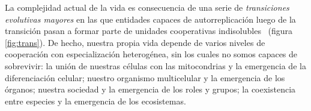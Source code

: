 \documentclass[a4paper,11pt]{book}
\theoremstyle{definition}
\begin{document}
La complejidad actual de la vida es consecuencia de una serie de \emph{transiciones evolutivas mayores} en las que entidades capaces de autorreplicaci\'on luego de la transici\'on pasan a formar parte de unidades cooperativas indisolubles~\cite{maynardSmith1995-majorTransitions, szathmary1995-evolutionaryTransitions, szathmary2015-evolutionaryTransitions} (figura \ref{fig:trans}).
%
De hecho, nuestra propia vida depende de varios niveles de cooperaci\'on con especializaci\'on heterog\'enea, sin los cuales no somos capaces de sobrevivir: la uni\'on de nuestras c\'elulas con las mitocondrias y la emergencia de la diferenciaci\'on celular; nuestro organismo multicelular y la emergencia de los \'organos; nuestra sociedad y la emergencia de los roles y grupos; la coexistencia entre especies y la emergencia de los ecosistemas.
%
%
\end{document}

